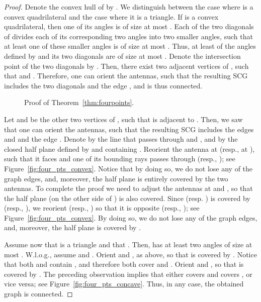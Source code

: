 \documentclass[11pt,letter]{article}
\newcommand{\old}[1]{{{}}}
\begin{document}
\begin{proof}
Denote the convex hull of  by .
We distinguish between the case where  is a convex quadrilateral and the case where it is a triangle.
If  is a convex quadrilateral, then one of its angles is of size at most .
Each of the two diagonals of  divides each of its corresponding two angles into two smaller angles,
such that at least one of these smaller angles is of size at most .
Thus, at least  of the  angles defined by  and its two diagonals are of size at most .
Denote the intersection point of the two diagonals by . Then, there exist two adjacent vertices  of , such that
 and . Therefore, one can orient the antennas, such that
the resulting SCG includes the two diagonals and the edge , and is thus connected.

\begin{figure}[htb]
 \centering
	\caption{Proof of Theorem~\ref{thm:fourpoints}.}
\end{figure}

\old{
\begin{figure}[htp]
   \centering
       \texttt{[image: fig/lemma1\_convex]}
       \texttt{[image: fig/lemma1\_concave2]}
   \caption{Proof of Theorem~\ref{thm:fourpoints}.}
   \label{fig:four_pts}
\end{figure}
}
Let  and  be the other two vertices of , such that  is adjacent to .
Then, we saw that one can orient the antennas, such that the resulting SCG includes
the edges  and  and the edge .
Denote by  the line that passes through  and , and
by  the closed half plane defined by  and containing .
Reorient the antenna  at  (resp.,  at ), such that it faces  and one of its bounding rays
passes through  (resp., ); see Figure~\ref{fig:four_pts_convex}.
Notice that by doing so, we do not lose any of the graph edges, and, moreover,
the half plane  is entirely covered by the two antennas.
To complete the proof we need to adjust the antennas at  and , so that the half plane 
(on the other side of ) is also covered.
Since  (resp. ) is covered by  (resp., ), we reorient  (resp., ) so that
it is opposite  (resp., ); see Figure~\ref{fig:four_pts_convex}. By doing so,
we do not lose any of the graph edges, and, moreover, the half plane  is covered by .

Assume now that  is a triangle  and that . Then,  has at least
two angles of size at most . W.l.o.g., assume  and .
Orient  and , as above, so that  is covered by .
Notice that both  and  contain , and therefore both cover  and .
Orient  and , so that  is covered by . The preceding observation implies that
either  covers  and  covers , or vice versa; see Figure~\ref{fig:four_pts_concave}.
Thus, in any case, the obtained graph is connected.

\end{proof}
\end{document}
